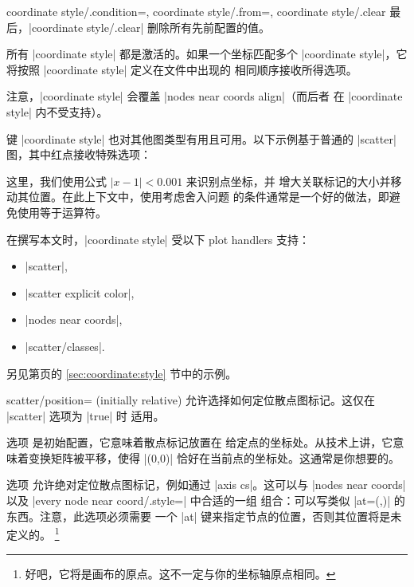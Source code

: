 {\begin{pgfplotskeylist}{%
    coordinate style/.condition=,
    coordinate style/.from=,
    coordinate style/.clear%
}
    最后，|coordinate style/.clear| 删除所有先前配置的值。

    所有 |coordinate style| 都是激活的。如果一个坐标匹配多个
    |coordinate style|，它将按照 |coordinate style| 定义在文件中出现的
    相同顺序接收所得选项。

    注意，|coordinate style| 会覆盖 |nodes near coords align|（而后者
    在 |coordinate style| 内不受支持）。

    键 |coordinate style| 也对其他图类型有用且可用。以下示例基于普通的
    |scatter| 图，其中红点接收特殊选项：
\begin{codeexample}[]
\end{codeexample}
    这里，我们使用公式 $\lvert x-1 \rvert < 0.001$ 来识别点坐标，并
    增大关联标记的大小并移动其位置。在此上下文中，使用考虑舍入问题
    的条件通常是一个好的做法，即避免使用等于运算符。

    在撰写本文时，|coordinate style| 受以下 plot handlers 支持：
    \begin{itemize}
        \item |scatter|,
        \item |scatter explicit color|,
        \item |nodes near coords|,
        \item |scatter/classes|.
    \end{itemize}

    另见第\pageref{sec:coordinate:style}页的 \ref{sec:coordinate:style}
    节中的示例。
\end{pgfplotskeylist}

\begin{pgfplotskey}{scatter/position= (initially relative)}
    允许选择如何定位散点图标记。这仅在 |scatter| 选项为 |true| 时
    适用。

    选项  是初始配置，它意味着散点标记放置在
    给定点的坐标处。从技术上讲，它意味着变换矩阵被平移，使得
    |(0,0)| 恰好在当前点的坐标处。这通常是你想要的。

    选项  允许绝对定位散点图标记，例如通过
    |axis cs|。这可以与 |nodes near coords| 以及
    |every node near coord/.style=| 中合适的一组
     组合：可以写类似
    |at={(\coordindex,)}| 的东西。注意，此选项必须需要
    一个 |at| 键来指定节点的位置，否则其位置将是未定义的。
    \footnote{好吧，它将是画布的原点。这不一定与你的坐标轴原点相同。}
\end{pgfplotskey}

}
